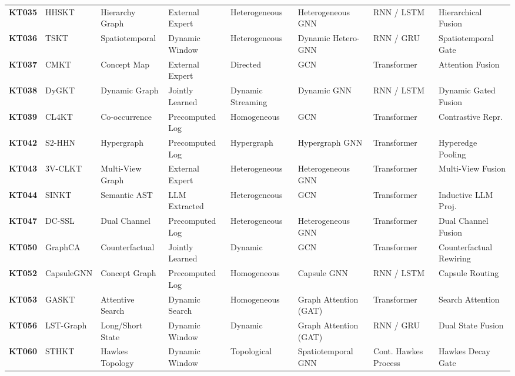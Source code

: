 \documentclass[10pt,journal,compsoc]{IEEEtran}
\begin{document}
\begin{table}[t]
{\begin{tabular}{@{}l l l l l l l l@{}}
\textbf{KT035} & HHSKT \cite{KT035_HHSKT_2023} & Hierarchy Graph & External Expert & Heterogeneous & Heterogeneous GNN & RNN / LSTM & Hierarchical Fusion \\
\textbf{KT036} & TSKT \cite{KT036_TSKT_2024} & Spatiotemporal & Dynamic Window & Heterogeneous & Dynamic Hetero-GNN & RNN / GRU & Spatiotemporal Gate \\
\textbf{KT037} & CMKT \cite{KT037_CMKT_2022} & Concept Map & External Expert & Directed & GCN & Transformer & Attention Fusion \\
\textbf{KT038} & DyGKT \cite{KT038_DyGKT_2024} & Dynamic Graph & Jointly Learned & Dynamic Streaming & Dynamic GNN & RNN / LSTM & Dynamic Gated Fusion \\
\textbf{KT039} & CL4KT \cite{KT039_CL4KT_2022} & Co-occurrence & Precomputed Log & Homogeneous & GCN & Transformer & Contrastive Repr. \\
\textbf{KT042} & S2-HHN \cite{KT042_S2HHN_2023} & Hypergraph & Precomputed Log & Hypergraph & Hypergraph GNN & Transformer & Hyperedge Pooling \\
\textbf{KT043} & 3V-CLKT \cite{KT043_3VCLKT_2024} & Multi-View Graph & External Expert & Heterogeneous & Heterogeneous GNN & Transformer & Multi-View Fusion \\
\textbf{KT044} & SINKT \cite{KT044_SINKT_2024} & Semantic AST & LLM Extracted & Heterogeneous & GCN & Transformer & Inductive LLM Proj. \\
\textbf{KT047} & DC-SSL \cite{KT047_DCSSL_2023} & Dual Channel & Precomputed Log & Heterogeneous & Heterogeneous GNN & Transformer & Dual Channel Fusion \\
\textbf{KT050} & GraphCA \cite{KT050_GraphCA_2023} & Counterfactual & Jointly Learned & Dynamic & GCN & Transformer & Counterfactual Rewiring \\
\textbf{KT052} & CapsuleGNN \cite{KT052_CapsuleGNN_2022} & Concept Graph & Precomputed Log & Homogeneous & Capsule GNN & RNN / LSTM & Capsule Routing \\
\textbf{KT053} & GASKT \cite{KT053_GASKT_2021} & Attentive Search & Dynamic Search & Homogeneous & Graph Attention (GAT) & Transformer & Search Attention \\
\textbf{KT056} & LST-Graph \cite{KT056_LSTGraph_2025} & Long/Short State & Dynamic Window & Dynamic & Graph Attention (GAT) & RNN / GRU & Dual State Fusion \\
\textbf{KT060} & STHKT \cite{KT060_STHKT_2025} & Hawkes Topology & Dynamic Window & Topological & Spatiotemporal GNN & Cont. Hawkes Process & Hawkes Decay Gate \\

\end{tabular}}
\end{table}
\end{document}
